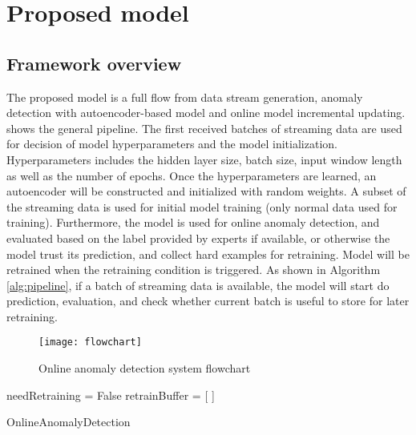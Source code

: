 \chapter{Proposed model}
\label{chap:Proposedmodel}

\section{Framework overview}
\label{sec:framework}

The proposed model is a full flow from data stream generation, anomaly detection with autoencoder-based model and online model incremental updating.  shows the general pipeline. The first received batches of streaming data are used for decision of model hyperparameters and the model initialization. Hyperparameters includes the hidden layer size, batch size, input window length as well as the number of epochs. Once the hyperparameters are learned, an autoencoder will be constructed and initialized with random weights. A subset of the streaming data is used for initial model training (only normal data used for training). Furthermore, the model is used for online anomaly detection, and evaluated based on the label provided by experts if available, or otherwise the model trust its prediction, and collect hard examples for retraining. Model will be retrained when the retraining condition is triggered. As shown in Algorithm \ref{alg:pipeline}, if a batch of streaming data is available, the model will start do prediction, evaluation, and check whether current batch is useful to store for later retraining. 


\begin{figure}[h]
\centering
\texttt{[image: flowchart]}
\caption[Online anomaly detection system flowchart]{Online anomaly detection system flowchart}
\label{fig:flowchart}
\end{figure}

\begin{algorithm}[h]

\BlankLine 
needRetraining = False\;
retrainBuffer = [ ]\;
 \caption{OnlineAnomalyDetection}
\label{alg:pipeline}
\end{algorithm}



